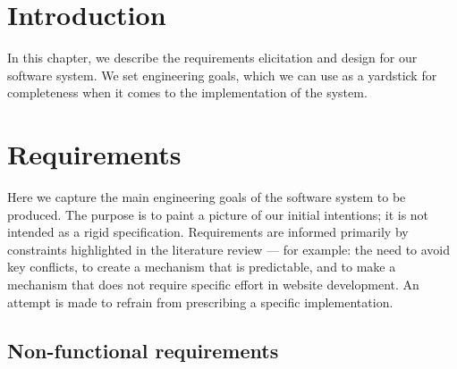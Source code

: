 \documentclass[11pt,openright,a4paper]{report}
\begin{document}
\newcommand{\reqreset}{
    \setcounter{reqcountbackup}{0}
    \setcounter{reqcount}{0}
}

\newcommand{\reqend}{
    \setcounter{reqcountbackup}{\value{reqcount}}
    \end{list}
}


\reqinit
\section{Introduction}
In this chapter, we describe the requirements elicitation and design for our software system. We set engineering goals, which we can use as a yardstick for completeness when it comes to the implementation of the system.
\section{Requirements}
Here we capture the main engineering goals of the software system to be produced. The purpose is to paint a picture of our initial intentions; it is not intended as a rigid specification. Requirements are informed primarily by constraints highlighted in the literature review --- for example: the need to avoid key conflicts, to create a mechanism that is predictable, and to make a mechanism that does not require specific effort in website development.
An attempt is made to refrain from prescribing a specific implementation.

\newcommand{\reqitem}[2]{\item {#1} \\\textit{#2}}

\subsection{Non-functional requirements}
\end{document}
